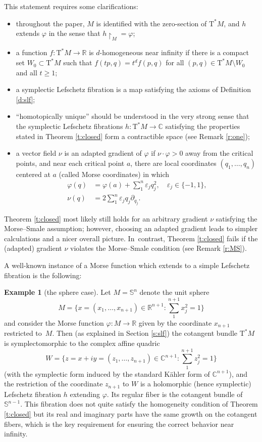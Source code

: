\documentclass[JEP,XML,SOM,Unicode]{cedram}
\let\epsilon\varepsilon
\newcommand{\C}{{\mathbb C}}
\newcommand{\R}{{\mathbb R}}
\newcommand{\bS}{{\mathbb S}}
\newcommand{\etc}{,\ldots,}
\newcommand{\sT}{\mathrm{T}^\ast}
\newcommand{\rst}[1]{{\upharpoonright}_{\!#1}}
\newcommand{\with}{\mathrel{:}}
\let\del\partial
\let\on\colon
\let\sgn\epsilon
\theoremstyle{plain}
\theoremstyle{definition}
\newtheorem{example}{Example}
\begin{document}
This statement requires some clarifications:
\begin{itemize}
\item
throughout the paper, $M$ is identified with the zero-section of $\sT M$, and
$h$ extends $\varphi$ in the sense that $h \rst M = \varphi$;
\item
a function $f \on \sT M \to \R$ is $d$-homogeneous near infinity if there is a
compact set $W_0 \subset \sT M$ such that $f(tp,q) = t^d f(p,q)$ for all $(p,q)
\in \sT M \setminus W_0$ and all $t \ge 1$;
\item
a symplectic Lefschetz fibration is a map satisfying the axioms of Definition
\ref{d:slf};
\item
``homotopically unique'' should be understood in the very strong sense that the
symplectic Lefschetz fibrations $h \on \sT M \to \C$ satisfying the properties
stated in Theorem \ref{t:closed} form a contractible space (see Remark \ref{r:one});
\item
a vector field $\nu$ is an adapted gradient of $\varphi$ if $\nu \cdot \varphi
> 0$ away from the critical points, and near each critical point $a$, there are
local coordinates $(q_1 \etc q_n)$ centered at $a$ (called Morse coordinates) in
which
\begin{align*}
	\varphi(q) &= \varphi(a) + \sum_1^n \sgn_j q_j^2, \quad \sgn_j \in \{-1,1\},
	\\ \tag*{and}
	\nu(q) &= 2 \sum_1^n \sgn_j q_j \del_{q_j}.
\end{align*}
\end{itemize}
Theorem \ref{t:closed} most likely still holds for an arbitrary gradient $\nu$
satisfying the Morse--Smale assumption; however, choosing an adapted gradient
leads to simpler calculations and a nicer overall picture. In~contrast, Theorem
\ref{t:closed} fails if the (adapted) gradient $\nu$ violates the Morse--Smale
condition (see Remark \ref{r:MS}).

A well-known instance of a Morse function which extends to a simple Lefschetz
fibration is the following:

\begin{example}[the sphere case]
Let $M = \bS^n$ denote the unit sphere
\[
\textstyle
M = \bigl\{x = (x_1 \etc x_{n+1}) \in \R^{n+1} \with
 \sum_1^{n+1} x_j^2 = 1\bigr\}
\]
and consider the Morse function $\varphi \on M \to \R$ given by the coordinate
$x_{n+1}$ restricted to~$M$. Then (as explained in Section \ref{s:slf}) the
cotangent bundle $\sT M$ is symplectomorphic to the complex affine quadric
\[
\textstyle 
W = \bigl\{z = x+iy = (z_1 \etc z_{n+1}) \in \C^{n+1} \with
 \sum_1^{n+1} z_j^2 = 1 \bigr\}
\]
(with the symplectic form induced by the standard Kähler form of $\C^{n+1}$),
and the restriction of the coordinate $z_{n+1}$ to $W$ is a holomorphic (hence
symplectic) Lefschetz fibration $h$ extending $\varphi$. Its regular fiber is
the cotangent bundle of $\bS^{n-1}$. This fibration does not quite satisfy the
homogeneity condition of Theorem \ref{t:closed} but its real and imaginary parts
have the same growth on the cotangent fibers, which is the key requirement for
ensuring the correct behavior near infinity.
\end{example}
\end{document}
